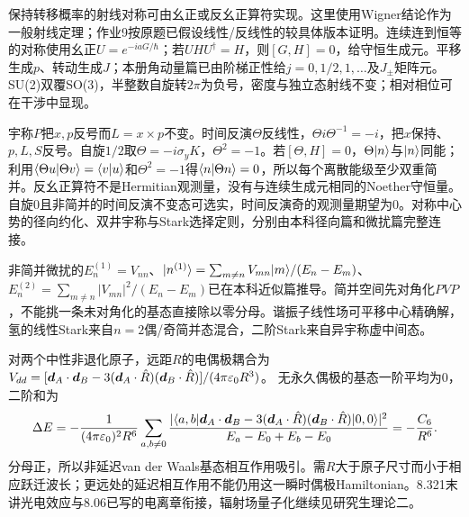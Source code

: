 保持转移概率的射线对称可由幺正或反幺正算符实现。这里使用Wigner结论作为一般射线定理；作业9按原题已假设线性/反线性的较具体版本证明。连续连到恒等的对称使用幺正$U=e^{-iaG/\hbar}$；若$UHU^\dagger=H$，则$[G,H]=0$，给守恒生成元。平移生成$p$、转动生成$J$；本册角动量篇已由阶梯正性给$j=0,1/2,1,\ldots$及$J_\pm$矩阵元。SU(2)双覆SO(3)，半整数自旋转$2\pi$为负号，密度与独立态射线不变；相对相位可在干涉中显现。

宇称$P$把$x,p$反号而$L=x\times p$不变。时间反演$\Theta$反线性，$\Theta i\Theta^{-1}=-i$，把$x$保持、$p,L,S$反号。自旋$1/2$取$\Theta=-i\sigma_yK$，$\Theta^2=-1$。若$[\Theta,H]=0$，$\Theta\lvert n\rangle$与$\lvert n\rangle$同能；利用$\langle \Theta u\vert \Theta v\rangle=\langle v\vert u\rangle$和$\Theta^2=-1$得$\langle n\vert \Theta n\rangle=0$，所以每个离散能级至少双重简并。反幺正算符不是Hermitian观测量，没有与连续生成元相同的Noether守恒量。自旋0且非简并的时间反演不变态可选实，时间反演奇的观测量期望为0。对称中心势的径向约化、双井宇称与Stark选择定则，分别由本科径向篇和微扰篇完整连接。

非简并微扰的$E_n^{(1)}=V_{nn}$、$\lvert n^{(1)}\rangle=\sum_{m\ne n}V_{mn}\lvert m\rangle/(E_n-E_m)$、$E_n^{(2)}=\sum_{m\ne n}|V_{mn}|^2/(E_n-E_m)$已在本科近似篇推导。简并空间先对角化$PVP$，不能挑一条未对角化的基态直接除以零分母。谐振子线性场可平移中心精确解，氢的线性Stark来自$n=2$偶/奇简并态混合，二阶Stark来自异宇称虚中间态。

对两个中性非退化原子，远距$R$的电偶极耦合为
$V_{dd}=[\boldsymbol{d}_A\cdot\boldsymbol{d}_B-3(\boldsymbol{d}_A\cdot\hat R)(\boldsymbol{d}_B\cdot\hat R)]/(4\pi\varepsilon_0R^3)$。
无永久偶极的基态一阶平均为0，二阶和为
\[
 \Delta E=-\frac1{(4\pi\varepsilon_0)^2R^6}
 \sum_{a,b\ne0}\frac{|\langle a,b\rvert\boldsymbol{d}_A\cdot\boldsymbol{d}_B-3(\boldsymbol{d}_A\cdot\hat R)(\boldsymbol{d}_B\cdot\hat R)\lvert 0,0\rangle|^2}
 {E_a-E_0+E_b-E_0}=-\frac{C_6}{R^6}.
\]
分母正，所以非延迟van der Waals基态相互作用吸引。需$R$大于原子尺寸而小于相应跃迁波长；更远处的延迟相互作用不能仍用这一瞬时偶极Hamiltonian。8.321末讲光电效应与8.06已写的电离章衔接，辐射场量子化继续见研究生理论二。
